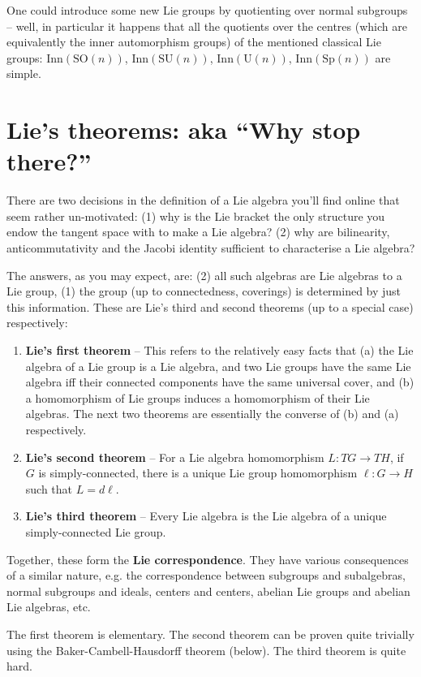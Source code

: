 \documentclass{article}
\newcommand{\Inn}{\mathrm{Inn}}
\newcommand{\gSO}{\mathrm{SO}}
\newcommand{\gSU}{\mathrm{SU}}
\newcommand{\gU}{\mathrm{U}}
\newcommand{\gSp}{\mathrm{Sp}}
\begin{document}
One could introduce some new Lie groups by quotienting over normal subgroups -- well, in particular it happens that all the quotients over the centres (which are equivalently the inner automorphism groups) of the mentioned classical Lie groups: $\Inn(\gSO(n))$, $\Inn(\gSU(n))$, $\Inn(\gU(n))$, $\Inn(\gSp(n))$ are  simple.

\section{Lie's theorems: aka ``Why stop there?''}

There are two decisions in the definition of a Lie algebra you'll find online that seem rather un-motivated: (1) why is the Lie bracket the only structure you endow the tangent space with to make a Lie algebra? (2) why are bilinearity, anticommutativity and the Jacobi identity sufficient to characterise a Lie algebra?

The answers, as you may expect, are: (2) all such algebras are Lie algebras to a Lie group, (1) the group (up to connectedness, coverings) is determined by just this information. These are Lie's third and second theorems (up to a special case) respectively:

\begin{enumerate}
    \item\textbf{Lie's first theorem} -- This refers to the relatively easy facts that (a) the Lie algebra of a Lie group is a Lie algebra, and two Lie groups have the same Lie algebra iff their connected components have the same universal cover, and (b) a homomorphism of Lie groups induces a homomorphism of their Lie algebras. The next two theorems are essentially the converse of (b) and (a) respectively.
    \item\textbf{Lie's second theorem} -- For a Lie algebra homomorphism $L:TG\to TH$, if $G$ is simply-connected, there is a unique Lie group homomorphism $\ell: G\to H$ such that $L=d\ell$.
    \item\textbf{Lie's third theorem} -- Every Lie algebra is the Lie algebra of a unique simply-connected Lie group.
\end{enumerate}

Together, these form the \textbf{Lie correspondence}. They have various consequences of a similar nature, e.g. the correspondence between subgroups and subalgebras, normal subgroups and ideals, centers and centers, abelian Lie groups and abelian Lie algebras, etc.

The first theorem is elementary. The second theorem can be proven quite trivially using the Baker-Cambell-Hausdorff theorem (below). The third theorem is quite hard.
\end{document}
